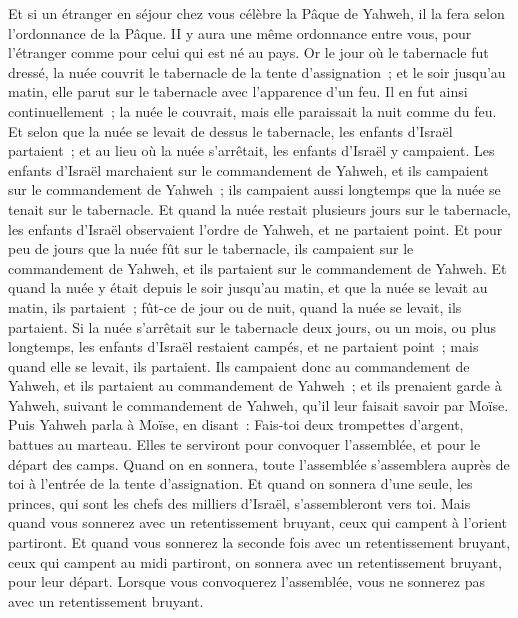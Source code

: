 \begin{multicols}{2}
Et si un étranger en séjour chez vous célèbre la Pâque de Yahweh, il la fera selon l'ordonnance de la Pâque. II y aura une même ordonnance entre vous, pour l'étranger comme pour celui qui est né au pays.
Or le jour où le tabernacle fut dressé, la nuée couvrit le tabernacle de la tente d'assignation~; et le soir jusqu'au matin, elle parut sur le tabernacle avec l'apparence d'un feu.
Il en fut ainsi continuellement~; la nuée le couvrait, mais elle paraissait la nuit comme du feu.
Et selon que la nuée se levait de dessus le tabernacle, les enfants d'Israël partaient~; et au lieu où la nuée s'arrêtait, les enfants d'Israël y campaient.
Les enfants d'Israël marchaient sur le commandement de Yahweh, et ils campaient sur le commandement de Yahweh~; ils campaient aussi longtemps que la nuée se tenait sur le tabernacle.
Et quand la nuée restait plusieurs jours sur le tabernacle, les enfants d'Israël observaient l'ordre de Yahweh, et ne partaient point.
Et pour peu de jours que la nuée fût sur le tabernacle, ils campaient sur le commandement de Yahweh, et ils partaient sur le commandement de Yahweh.
Et quand la nuée y était depuis le soir jusqu'au matin, et que la nuée se levait au matin, ils partaient~; fût-ce de jour ou de nuit, quand la nuée se levait, ils partaient.
Si la nuée s'arrêtait sur le tabernacle deux jours, ou un mois, ou plus longtemps, les enfants d'Israël restaient campés, et ne partaient point~; mais quand elle se levait, ils partaient.
Ils campaient donc au commandement de Yahweh, et ils partaient au commandement de Yahweh~; et ils prenaient garde à Yahweh, suivant le commandement de Yahweh, qu'il leur faisait savoir par Moïse.
\VerseOne{}Puis Yahweh parla à Moïse, en disant~:
Fais-toi deux trompettes d'argent, battues au marteau. Elles te serviront pour convoquer l'assemblée, et pour le départ des camps.
Quand on en sonnera, toute l'assemblée s'assemblera auprès de toi à l'entrée de la tente d'assignation.
Et quand on sonnera d'une seule, les princes, qui sont les chefs des milliers d'Israël, s'assembleront vers toi.
Mais quand vous sonnerez avec un retentissement bruyant, ceux qui campent à l'orient partiront.
Et quand vous sonnerez la seconde fois avec un retentissement bruyant, ceux qui campent au midi partiront, on sonnera avec un retentissement bruyant, pour leur départ.
Lorsque vous convoquerez l'assemblée, vous ne sonnerez pas avec un retentissement bruyant.

\end{multicols}
